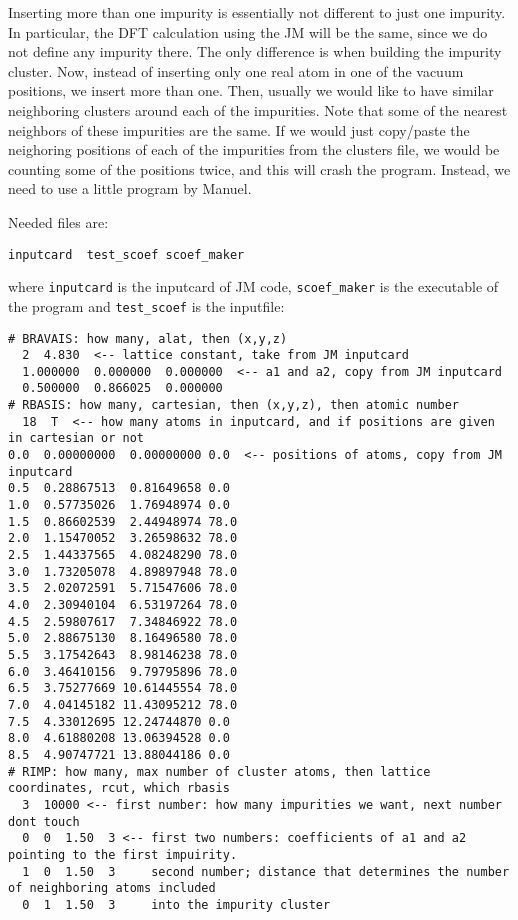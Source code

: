 \documentclass[11pt,fleqn]{book} %
\begin{document}
Inserting more than one impurity is essentially not different to
just one impurity. In particular, the DFT calculation using the JM will be the same,
since we do not define any impurity there.
The only difference is when building the impurity cluster.
Now, instead of inserting only one real atom in one of the vacuum positions,
we insert more than one. Then, usually we would like to have similar neighboring clusters
around each of the impurities. Note that some of the nearest neighbors of
these impurities are the same. If we would just copy/paste the neighoring positions
of each of the impurities from the clusters file, we would be counting some of the
positions twice, and this will crash the program.
Instead, we need to use a little program by Manuel.

Needed files are:
\begin{VBox}
\begin{verbatim}
inputcard  test_scoef scoef_maker
\end{verbatim}
\end{VBox}
where \verb|inputcard| is the inputcard of JM code, \verb|scoef_maker| is the
executable of the program and \verb|test_scoef| is the inputfile:

\begin{VBox}
\begin{verbatim}
# BRAVAIS: how many, alat, then (x,y,z)
  2  4.830  <-- lattice constant, take from JM inputcard
  1.000000  0.000000  0.000000  <-- a1 and a2, copy from JM inputcard
  0.500000  0.866025  0.000000
# RBASIS: how many, cartesian, then (x,y,z), then atomic number
  18  T  <-- how many atoms in inputcard, and if positions are given in cartesian or not
0.0  0.00000000  0.00000000 0.0  <-- positions of atoms, copy from JM inputcard
0.5  0.28867513  0.81649658 0.0
1.0  0.57735026  1.76948974 0.0
1.5  0.86602539  2.44948974 78.0
2.0  1.15470052  3.26598632 78.0
2.5  1.44337565  4.08248290 78.0
3.0  1.73205078  4.89897948 78.0
3.5  2.02072591  5.71547606 78.0
4.0  2.30940104  6.53197264 78.0
4.5  2.59807617  7.34846922 78.0
5.0  2.88675130  8.16496580 78.0
5.5  3.17542643  8.98146238 78.0
6.0  3.46410156  9.79795896 78.0
6.5  3.75277669 10.61445554 78.0
7.0  4.04145182 11.43095212 78.0
7.5  4.33012695 12.24744870 0.0
8.0  4.61880208 13.06394528 0.0
8.5  4.90747721 13.88044186 0.0
# RIMP: how many, max number of cluster atoms, then lattice coordinates, rcut, which rbasis
  3  10000 <-- first number: how many impurities we want, next number dont touch
  0  0  1.50  3 <-- first two numbers: coefficients of a1 and a2 pointing to the first impuirity.
  1  0  1.50  3     second number; distance that determines the number of neighboring atoms included
  0  1  1.50  3     into the impurity cluster
\end{verbatim}
\end{VBox}
\end{document}
